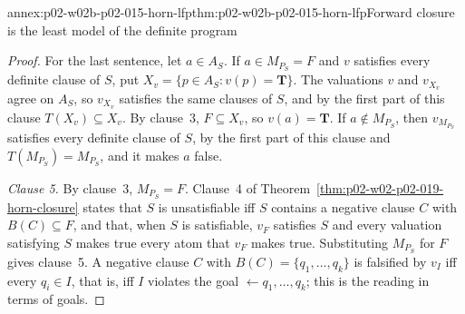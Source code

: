 \begin{annexitem}{annex:p02-w02b-p02-015-horn-lfp}{thm:p02-w02b-p02-015-horn-lfp}{Forward closure is the least model of the definite program}
\begin{proof}
For the last sentence, let \(a\in A_S\).  If \(a\in M_{P_S}=F\) and \(v\)
satisfies every definite clause of \(S\), put
\(X_v=\{p\in A_S:v(p)=\mathbf T\}\).  The valuations \(v\) and \(v_{X_v}\)
agree on \(A_S\), so \(v_{X_v}\) satisfies the same clauses of \(S\), and by
the first part of this clause \(T(X_v)\subseteq X_v\).  By clause~3,
\(F\subseteq X_v\), so \(v(a)=\mathbf T\).  If \(a\notin M_{P_S}\), then
\(v_{M_{P_S}}\) satisfies every definite clause of \(S\), by the first part
of this clause and \(T(M_{P_S})=M_{P_S}\), and it makes \(a\) false.

\emph{Clause 5.}  By clause~3, \(M_{P_S}=F\).  Clause~4 of
Theorem~\ref{thm:p02-w02-p02-019-horn-closure} states that \(S\) is
unsatisfiable iff \(S\) contains a negative clause \(C\) with
\(B(C)\subseteq F\), and that, when \(S\) is satisfiable, \(v_F\) satisfies
\(S\) and every valuation satisfying \(S\) makes true every atom that \(v_F\)
makes true.  Substituting \(M_{P_S}\) for \(F\) gives clause~5.  A negative
clause \(C\) with \(B(C)=\{q_1,\ldots,q_k\}\) is falsified by \(v_I\) iff
every \(q_i\in I\), that is, iff \(I\) violates the goal
\(\leftarrow q_1,\ldots,q_k\); this is the reading in terms of goals.
\end{proof}
\end{annexitem}

